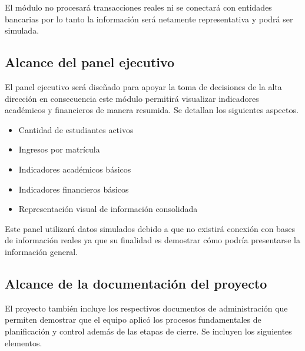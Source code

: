\documentclass[11pt,spanish]{article}
\begin{document}
El módulo no procesará transacciones reales ni se conectará con entidades bancarias por lo tanto la información será netamente representativa y podrá ser simulada.

\subsection{Alcance del panel ejecutivo}

El panel ejecutivo será diseñado para apoyar la toma de decisiones de la alta dirección en consecuencia este módulo permitirá visualizar indicadores académicos y financieros de manera resumida. Se detallan los siguientes aspectos.

\begin{itemize}[leftmargin=*]
    \item Cantidad de estudiantes activos
    \item Ingresos por matrícula
    \item Indicadores académicos básicos
    \item Indicadores financieros básicos
    \item Representación visual de información consolidada
\end{itemize}

Este panel utilizará datos simulados debido a que no existirá conexión con bases de información reales ya que su finalidad es demostrar cómo podría presentarse la información general.

\subsection{Alcance de la documentación del proyecto}

El proyecto también incluye los respectivos documentos de administración que permiten demostrar que el equipo aplicó los procesos fundamentales de planificación y control además de las etapas de cierre. Se incluyen los siguientes elementos.
\end{document}
